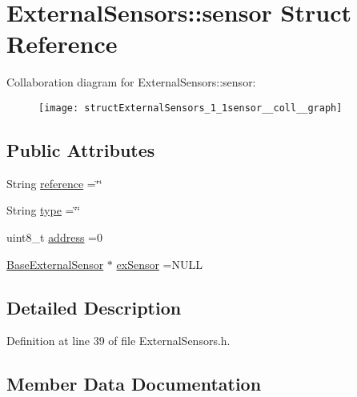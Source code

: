 \hypertarget{structExternalSensors_1_1sensor}{}\section{External\+Sensors\+:\+:sensor Struct Reference}
\label{structExternalSensors_1_1sensor}


Collaboration diagram for External\+Sensors\+:\+:sensor\+:\nopagebreak
\begin{figure}[H]
\begin{center}
\leavevmode
\texttt{[image: structExternalSensors\_1\_1sensor\_\_coll\_\_graph]}
\end{center}
\end{figure}
\subsection*{Public Attributes}
\begin{DoxyCompactItemize}
\item 
String \hyperlink{structExternalSensors_1_1sensor_afed5bdfd49732202a368b600cb8396fe}{reference} =\char`\"{}\char`\"{}
\item 
String \hyperlink{structExternalSensors_1_1sensor_a6acfdb02c742c2110d7bd2b5d9fce9e7}{type} =\char`\"{}\char`\"{}
\item 
uint8\+\_\+t \hyperlink{structExternalSensors_1_1sensor_a8d70ca58524521ed054fc6b81eb58d34}{address} =0
\item 
\hyperlink{classBaseExternalSensor}{Base\+External\+Sensor} $\ast$ \hyperlink{structExternalSensors_1_1sensor_a9bca150fd468b8d0e090e6d72c5c2b48}{ex\+Sensor} =N\+U\+LL
\end{DoxyCompactItemize}


\subsection{Detailed Description}


Definition at line 39 of file External\+Sensors.\+h.



\subsection{Member Data Documentation}
\mbox{\label{structExternalSensors_1_1sensor_a8d70ca58524521ed054fc6b81eb58d34}} 
